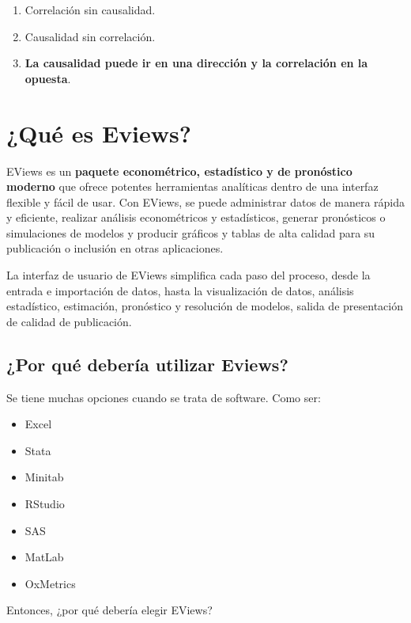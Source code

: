 \documentclass[
]{book}
\providecommand{\tightlist}{%
  \setlength{\itemsep}{0pt}\setlength{\parskip}{0pt}}
\begin{document}
\begin{enumerate}
\def\labelenumi{\arabic{enumi}.}
\tightlist
\item
  Correlación sin causalidad.
\item
  Causalidad sin correlación.
\item
  \textbf{La causalidad puede ir en una dirección y la correlación en la opuesta}.
\end{enumerate}

\hypertarget{quuxe9-es-eviews}{%
\section{¿Qué es Eviews?}\label{quuxe9-es-eviews}}

EViews es un \textbf{paquete econométrico, estadístico y de pronóstico moderno} que ofrece potentes herramientas analíticas dentro de una interfaz flexible y fácil de usar. Con EViews, se puede administrar datos de manera rápida y eficiente, realizar análisis econométricos y estadísticos, generar pronósticos o simulaciones de modelos y producir gráficos y tablas de alta calidad para su publicación o inclusión en otras aplicaciones.

La interfaz de usuario de EViews simplifica cada paso del proceso, desde la entrada e importación de datos, hasta la visualización de datos, análisis estadístico, estimación, pronóstico y resolución de modelos, salida de presentación de calidad de publicación.

\hypertarget{por-quuxe9-deberuxeda-utilizar-eviews}{%
\subsection{¿Por qué debería utilizar Eviews?}\label{por-quuxe9-deberuxeda-utilizar-eviews}}

Se tiene muchas opciones cuando se trata de software. Como ser:

\begin{itemize}
\tightlist
\item
  Excel
\item
  Stata
\item
  Minitab
\item
  RStudio
\item
  SAS
\item
  MatLab
\item
  OxMetrics
\end{itemize}

Entonces, ¿por qué debería elegir EViews?
\end{document}

